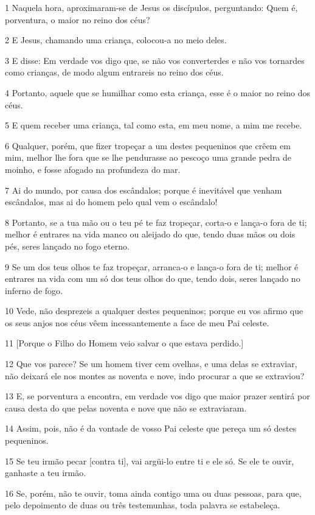 \par 1 Naquela hora, aproximaram-se de Jesus os discípulos, perguntando: Quem é, porventura, o maior no reino dos céus?
\par 2 E Jesus, chamando uma criança, colocou-a no meio deles.
\par 3 E disse: Em verdade vos digo que, se não vos converterdes e não vos tornardes como crianças, de modo algum entrareis no reino dos céus.
\par 4 Portanto, aquele que se humilhar como esta criança, esse é o maior no reino dos céus.
\par 5 E quem receber uma criança, tal como esta, em meu nome, a mim me recebe.
\par 6 Qualquer, porém, que fizer tropeçar a um destes pequeninos que crêem em mim, melhor lhe fora que se lhe pendurasse ao pescoço uma grande pedra de moinho, e fosse afogado na profundeza do mar.
\par 7 Ai do mundo, por causa dos escândalos; porque é inevitável que venham escândalos, mas ai do homem pelo qual vem o escândalo!
\par 8 Portanto, se a tua mão ou o teu pé te faz tropeçar, corta-o e lança-o fora de ti; melhor é entrares na vida manco ou aleijado do que, tendo duas mãos ou dois pés, seres lançado no fogo eterno.
\par 9 Se um dos teus olhos te faz tropeçar, arranca-o e lança-o fora de ti; melhor é entrares na vida com um só dos teus olhos do que, tendo dois, seres lançado no inferno de fogo.
\par 10 Vede, não desprezeis a qualquer destes pequeninos; porque eu vos afirmo que os seus anjos nos céus vêem incessantemente a face de meu Pai celeste.
\par 11 [Porque o Filho do Homem veio salvar o que estava perdido.]
\par 12 Que vos parece? Se um homem tiver cem ovelhas, e uma delas se extraviar, não deixará ele nos montes as noventa e nove, indo procurar a que se extraviou?
\par 13 E, se porventura a encontra, em verdade vos digo que maior prazer sentirá por causa desta do que pelas noventa e nove que não se extraviaram.
\par 14 Assim, pois, não é da vontade de vosso Pai celeste que pereça um só destes pequeninos.
\par 15 Se teu irmão pecar [contra ti], vai argüi-lo entre ti e ele só. Se ele te ouvir, ganhaste a teu irmão.
\par 16 Se, porém, não te ouvir, toma ainda contigo uma ou duas pessoas, para que, pelo depoimento de duas ou três testemunhas, toda palavra se estabeleça.
